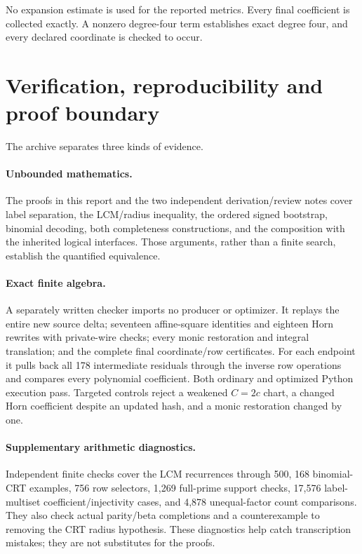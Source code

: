 \documentclass[11pt]{article}
\begin{document}
No expansion estimate is used for the reported metrics. Every final
coefficient is collected exactly. A nonzero degree-four term establishes
exact degree four, and every declared coordinate is checked to occur.

\section{Verification, reproducibility and proof boundary}\label{sec:verification}

The archive separates three kinds of evidence.

\paragraph{Unbounded mathematics.}
The proofs in this report and the two independent derivation/review notes
cover label separation, the LCM/radius inequality, the ordered signed
bootstrap, binomial decoding, both completeness constructions, and the
composition with the inherited logical interfaces. Those arguments, rather
than a finite search, establish the quantified equivalence.

\paragraph{Exact finite algebra.}
A separately written checker imports no producer or optimizer. It replays
the entire new source delta; seventeen affine-square identities and eighteen
Horn rewrites with private-wire checks; every monic restoration and integral
translation; and the complete final coordinate/row certificates. For each
endpoint it pulls back all 178 intermediate residuals through the inverse
row operations and compares every polynomial coefficient. Both ordinary
and optimized Python execution pass. Targeted controls reject a weakened
$C=2c$ chart, a changed Horn coefficient despite an updated hash, and a
monic restoration changed by one.

\paragraph{Supplementary arithmetic diagnostics.}
Independent finite checks cover the LCM recurrences through 500, 168
binomial-CRT examples, 756 row selectors, 1,269 full-prime support checks,
17,576 label-multiset coefficient/injectivity cases, and 4,878 unequal-factor
count comparisons. They also check actual parity/beta completions and a
counterexample to removing the CRT radius hypothesis. These diagnostics
help catch transcription mistakes; they are not substitutes for the proofs.
\end{document}
